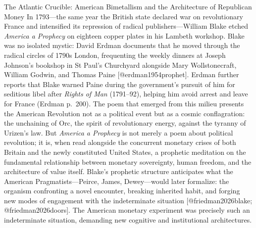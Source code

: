 \documentclass[
  ignorenonframetext,
]{beamer}
\author{\texorpdfstring{}{}}
\date{}
\begin{document}
\begin{frame}{The Atlantic Crucible: American Bimetallism and the
Architecture of Republican Money}
\protect{}\label{the-atlantic-crucible-american-bimetallism-and-the-architecture-of-republican-money}
In 1793---the same year the British state declared war on revolutionary
France and intensified its repression of radical publishers---William
Blake etched \emph{America a Prophecy} on eighteen copper plates in his
Lambeth workshop. Blake was no isolated mystic: David Erdman documents
that he moved through the radical circles of 1790s London, frequenting
the weekly dinners at Joseph Johnson's bookshop in St Paul's Churchyard
alongside Mary Wollstonecraft, William Godwin, and Thomas Paine
{[}@erdman1954prophet{]}. Erdman further reports that Blake warned Paine
during the government's pursuit of him for seditious libel after
\emph{Rights of Man} (1791--92), helping him avoid arrest and leave for
France (Erdman p.~200). The poem that emerged from this milieu presents
the American Revolution not as a political event but as a cosmic
conflagration: the unchaining of Orc, the spirit of revolutionary
energy, against the tyranny of Urizen's law. But \emph{America a
Prophecy} is not merely a poem about political revolution; it is, when
read alongside the concurrent monetary crises of both Britain and the
newly constituted United States, a prophetic meditation on the
fundamental relationship between monetary sovereignty, human freedom,
and the architecture of value itself. Blake's prophetic structure
anticipates what the American Pragmatists---Peirce, James, Dewey---would
later formalize: the organism confronting a novel encounter, breaking
inherited habit, and forging new modes of engagement with the
indeterminate situation {[}@friedman2026blake; @friedman2026doors{]}.
The American monetary experiment was precisely such an indeterminate
situation, demanding new cognitive and institutional architectures.


\end{frame}
\end{document}
